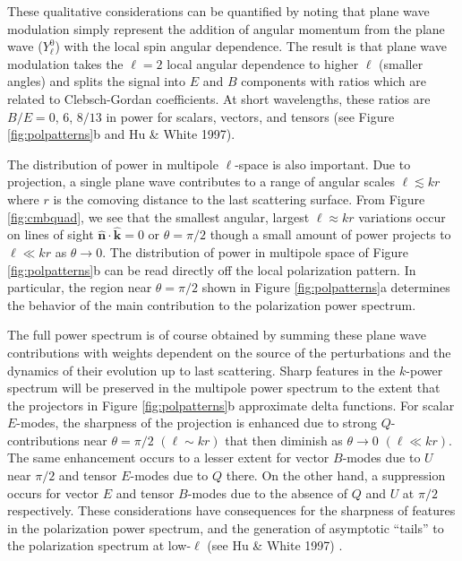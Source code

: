 \documentclass[a4paper,11pt]{article}
\begin{document}
{\noindent}These qualitative considerations can be quantified by noting that plane wave modulation simply represent the addition of angular momentum from the plane wave ($Y_\ell^0$) with the local spin angular dependence. The result is that plane wave modulation takes the $\ell=2$ local angular dependence to higher $\ell$ (smaller angles) and splits the signal into $E$ and $B$ components with ratios which are related to Clebsch-Gordan coefficients. At short wavelengths, these ratios are $B/E=0$, $6$, $8/13$ in power for scalars, vectors, and tensors (see Figure \ref{fig:polpatterns}b and Hu \& White 1997).

{\noindent}The distribution of power in multipole $\ell$-space is also important. Due to projection, a single plane wave contributes to a range of angular scales  $\ell\lesssim kr$ where $r$ is the comoving distance to the last scattering surface. From Figure \ref{fig:cmbquad}, we see that the smallest angular, largest $\ell\approx kr$ variations occur on lines of sight $\bm{\hat{n}}\cdot\bm{\hat{k}}=0$ or $\theta=\pi/2$ though a small amount of power projects to $\ell\ll kr$ as $\theta\rightarrow0$. The distribution of power in multipole space of Figure \ref{fig:polpatterns}b can be read directly off the local polarization pattern. In particular, the region near $\theta=\pi/2$ shown in Figure \ref{fig:polpatterns}a determines the behavior of the main contribution to the polarization power spectrum.

{\noindent}The full power spectrum is of course obtained by summing these plane wave contributions with weights dependent on the source of the perturbations and the dynamics of their evolution up to last scattering. Sharp features in the $k$-power spectrum will be preserved in the multipole power spectrum to the extent that the projectors in Figure \ref{fig:polpatterns}b approximate delta functions. For scalar $E$-modes, the sharpness of the projection is enhanced due to strong $Q$-contributions near $\theta=\pi/2$ $(\ell\sim kr)$ that then diminish as $\theta\rightarrow0$ $(\ell\ll kr)$. The same enhancement occurs to a lesser extent for vector $B$-modes due to $U$ near $\pi/2$ and tensor $E$-modes due to $Q$ there. On the other hand, a suppression occurs for vector $E$ and tensor $B$-modes due to the absence of $Q$ and $U$ at $\pi/2$ respectively. These considerations have consequences for the sharpness of features in the polarization power spectrum, and the generation of asymptotic ``tails'' to the polarization spectrum at low-$\ell$ (see Hu \& White 1997) .
\end{document}
